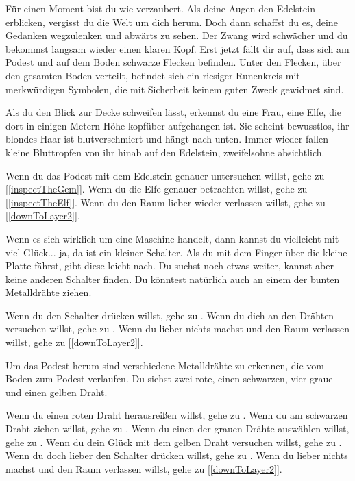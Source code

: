 
Für einen Moment bist du wie verzaubert. Als deine Augen den Edelstein erblicken, vergisst du die Welt um dich herum. Doch dann schaffst du es, deine Gedanken wegzulenken und abwärts zu sehen. Der Zwang wird schwächer und du bekommst langsam wieder einen klaren Kopf. Erst jetzt fällt dir auf, dass sich am Podest und auf dem Boden schwarze Flecken befinden. Unter den Flecken, über den gesamten Boden verteilt, befindet sich ein riesiger Runenkreis mit merkwürdigen Symbolen, die mit Sicherheit keinem guten Zweck gewidmet sind.

Als du den Blick zur Decke schweifen lässt, erkennst du eine Frau, eine Elfe, die dort in einigen Metern Höhe kopfüber aufgehangen ist. Sie scheint bewusstlos, ihr blondes Haar ist blutverschmiert und hängt nach unten. Immer wieder fallen kleine Bluttropfen von ihr hinab auf den Edelstein, zweifelsohne absichtlich.

Wenn du das Podest mit dem Edelstein genauer untersuchen willst, gehe zu [\ref{inspectTheGem}].
Wenn du die Elfe genauer betrachten willst, gehe zu [\ref{inspectTheElf}].
Wenn du den Raum lieber wieder verlassen willst, gehe zu [\ref{downToLayer2}].


Wenn es sich wirklich um eine Maschine handelt, dann kannst du vielleicht mit viel Glück... ja, da ist ein kleiner Schalter. Als du mit dem Finger über die kleine Platte fährst, gibt diese leicht nach. Du suchst noch etwas weiter, kannst aber keine anderen Schalter finden. Du könntest natürlich auch an einem der bunten Metalldrähte ziehen.

Wenn du den Schalter drücken willst, gehe zu .
Wenn du dich an den Drähten versuchen willst, gehe zu .
Wenn du lieber nichts machst und den Raum verlassen willst, gehe zu [\ref{downToLayer2}].


Um das Podest herum sind verschiedene Metalldrähte zu erkennen, die vom Boden zum Podest verlaufen. Du siehst zwei rote, einen schwarzen, vier graue und einen gelben Draht.

Wenn du einen roten Draht herausreißen willst, gehe zu .
Wenn du am schwarzen Draht ziehen willst, gehe zu .
Wenn du einen der grauen Drähte auswählen willst, gehe zu .
Wenn du dein Glück mit dem gelben Draht versuchen willst, gehe zu .
Wenn du doch lieber den Schalter drücken willst, gehe zu .
Wenn du lieber nichts machst und den Raum verlassen willst, gehe zu [\ref{downToLayer2}].

